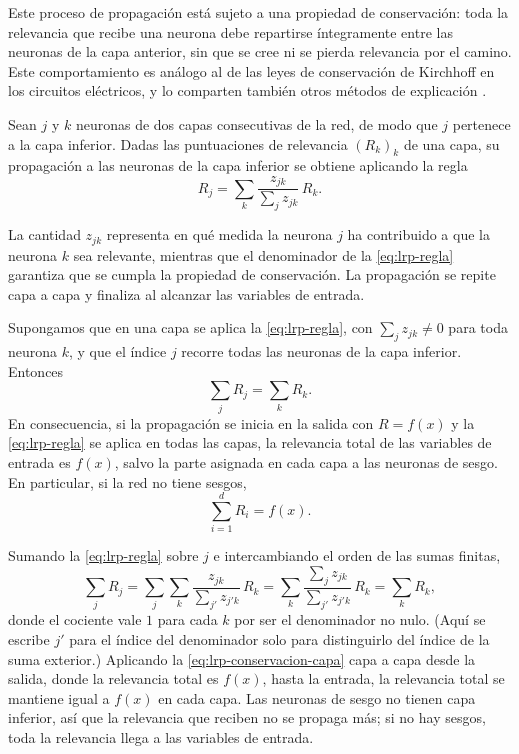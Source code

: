 Este proceso de propagación está sujeto a una propiedad de conservación: toda la
relevancia que recibe una neurona debe repartirse íntegramente entre las neuronas
de la capa anterior, sin que se cree ni se pierda relevancia por el camino. Este
comportamiento es análogo al de las leyes de conservación de Kirchhoff en los
circuitos eléctricos, y lo comparten también otros métodos de explicación
\cite{landecker2013,shrikumar2017,zhang2016excitation}.

Sean $j$ y $k$ neuronas de dos capas consecutivas de la red, de modo que $j$
pertenece a la capa inferior. Dadas las puntuaciones de relevancia $(R_k)_k$ de
una capa, su propagación a las neuronas de la capa inferior se obtiene aplicando
la regla
\begin{equation}\label{eq:lrp-regla}
  R_j = \sum_{k} \frac{z_{jk}}{\sum_{j} z_{jk}} \, R_k .
\end{equation}

La cantidad $z_{jk}$ representa en qué medida la neurona $j$ ha contribuido a
que la neurona $k$ sea relevante, mientras que el denominador de la
\cref{eq:lrp-regla} garantiza que se cumpla la propiedad de conservación. La
propagación se repite capa a capa y finaliza al alcanzar las variables de
entrada.

\begin{proposicion}\label{prop:lrp-conservacion}
Supongamos que en una capa se aplica la \cref{eq:lrp-regla}, con
$\sum_{j} z_{jk} \neq 0$ para toda neurona $k$, y que el índice $j$ recorre todas
las neuronas de la capa inferior. Entonces
\begin{equation}\label{eq:lrp-conservacion-capa}
  \sum_{j} R_j = \sum_{k} R_k .
\end{equation}
En consecuencia, si la propagación se inicia en la salida con $R = f(x)$ y la
\cref{eq:lrp-regla} se aplica en todas las capas, la relevancia total de las
variables de entrada es $f(x)$, salvo la parte asignada en cada capa a las neuronas
de sesgo. En particular, si la red no tiene sesgos,
\[
  \sum_{i=1}^{d} R_i = f(x).
\]
\end{proposicion}
\begin{demostracion}
Sumando la \cref{eq:lrp-regla} sobre $j$ e intercambiando el orden de las sumas
finitas,
\[
  \sum_{j} R_j
  = \sum_{j} \sum_{k} \frac{z_{jk}}{\sum_{j'} z_{j'k}} \, R_k
  = \sum_{k} \frac{\sum_{j} z_{jk}}{\sum_{j'} z_{j'k}} \, R_k
  = \sum_{k} R_k ,
\]
donde el cociente vale $1$ para cada $k$ por ser el denominador no nulo. (Aquí se
escribe $j'$ para el índice del denominador solo para distinguirlo del índice de
la suma exterior.) Aplicando la \cref{eq:lrp-conservacion-capa} capa a capa desde
la salida, donde la relevancia total es $f(x)$, hasta la entrada, la relevancia
total se mantiene igual a $f(x)$ en cada capa. Las neuronas de sesgo no tienen
capa inferior, así que la relevancia que reciben no se propaga más; si no hay
sesgos, toda la relevancia llega a las variables de entrada.
\end{demostracion}

